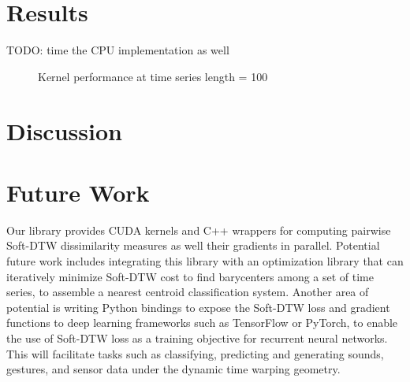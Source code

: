 \documentclass[12pt, letterpaper]{article}
\begin{document}
\section{Results}

TODO: time the CPU implementation as well

\begin{figure}
    \begin{center}
        
    \end{center}
    \caption{Kernel performance at time series length = 100}
\end{figure}

\section{Discussion}

\section{Future Work}

Our library provides CUDA kernels and C++ wrappers for computing pairwise
Soft-DTW dissimilarity measures as well their gradients in parallel. Potential
future work includes integrating this library with an optimization library that
can iteratively minimize Soft-DTW cost to find barycenters among a set of time
series, to assemble a nearest centroid classification system. Another area of
potential is writing Python bindings to expose the Soft-DTW loss and gradient
functions to deep learning frameworks such as TensorFlow or PyTorch, to enable
the use of Soft-DTW loss as a training objective for recurrent neural networks.
This will facilitate tasks such as classifying, predicting and generating sounds,
gestures, and sensor data under the dynamic time warping geometry.

\printbibliography[]
\end{document}
